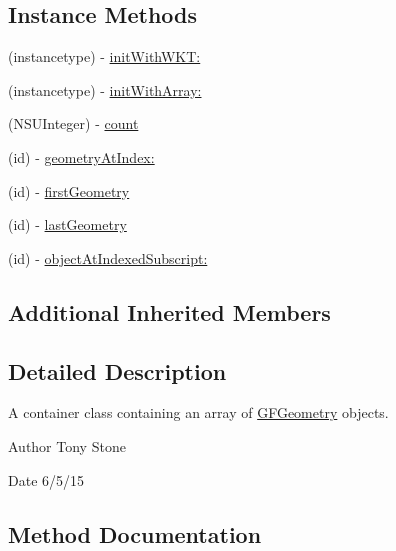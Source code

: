 \subsection*{Instance Methods}
\begin{DoxyCompactItemize}
\item 
(instancetype) -\/ \hyperlink{interface_g_f_geometry_collection_a13156620e5298fe7d286bb800df4097b}{init\+With\+W\+K\+T\+:}
\item 
(instancetype) -\/ \hyperlink{interface_g_f_geometry_collection_a260bb3daa9d3324cb1cc2fa9ef3a61e9}{init\+With\+Array\+:}
\item 
(N\+S\+U\+Integer) -\/ \hyperlink{interface_g_f_geometry_collection_a020dd5245b572a391ccbd1ea92699240}{count}
\item 
(id) -\/ \hyperlink{interface_g_f_geometry_collection_a4cd182279facec2850b47634aa0f6297}{geometry\+At\+Index\+:}
\item 
(id) -\/ \hyperlink{interface_g_f_geometry_collection_a610f72a22d76a3ce6c9eaeb2dad35c0e}{first\+Geometry}
\item 
(id) -\/ \hyperlink{interface_g_f_geometry_collection_a89b3b6e2097cf5899a6d635ddcb95ef3}{last\+Geometry}
\item 
(id) -\/ \hyperlink{interface_g_f_geometry_collection_ac67dd4526580a8a38408e39c489a7503}{object\+At\+Indexed\+Subscript\+:}
\end{DoxyCompactItemize}
\subsection*{Additional Inherited Members}


\subsection{Detailed Description}
A container class containing an array of \hyperlink{interface_g_f_geometry}{G\+F\+Geometry} objects. 

\begin{DoxyAuthor}{Author}
Tony Stone 
\end{DoxyAuthor}
\begin{DoxyDate}{Date}
6/5/15 
\end{DoxyDate}


\subsection{Method Documentation}
\hypertarget{interface_g_f_geometry_collection_a13156620e5298fe7d286bb800df4097b}{}
